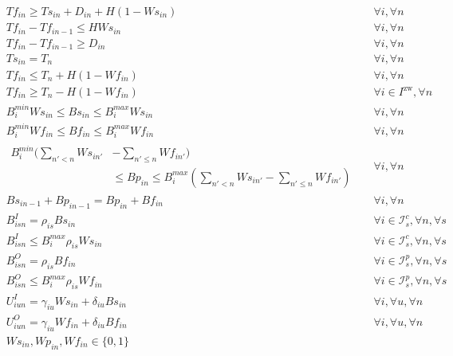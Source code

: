 \begin{align}
		  & Tf_{in} \ge Ts_{in} + D_{in} + H(1 - Ws_{in}) && \forall i, \forall n \\
		  & Tf_{in} - Tf_{in-1} \le H Ws_{in} && \forall i, \forall n \\
		  & Tf_{in} - Tf_{in-1} \ge D_{in} && \forall i, \forall n \\
		  & Ts_{in} = T_n && \forall i, \forall n \\
		  & Tf_{in} \le T_n + H(1 - Wf_{in}) && \forall i, \forall n \\
		  & Tf_{in} \ge T_n - H(1 - Wf_{in}) && \forall i \in I^{\text{zw}}, \forall n \\
		  & B_{i}^{min} Ws_{in} \le Bs_{in} \le B_{i}^{max} Ws_{in} &&  \forall i, \forall n \\
		  & B_{i}^{min} Wf_{in} \le Bf_{in} \le B_{i}^{max} Wf_{in} &&  \forall i, \forall n \\
&\begin{aligned}
		   B_{i}^{min} (\sum_{n' < n} Ws_{in'} & - \sum_{n' \le n} Wf_{in'})\\ &\le Bp_{in} \le B_{i}^{max}  (\sum_{n' < n} Ws_{in'} - \sum_{n' \le n} Wf_{in'})  
\end{aligned}  && \forall i, \forall n \\
		  &Bs_{in-1} + Bp_{in-1} = Bp_{in} + Bf_{in} && \forall i, \forall n \\
		  &B_{isn}^I = \rho_{is} Bs_{in} && \forall i \in \mathcal{I}_{s}^c, \forall n, \forall s \\
		  &B_{isn}^I \le B_{i}^{max} \rho_{is} Ws_{in}  && \forall i \in \mathcal{I}_{s}^c, \forall n, \forall s \\
		  &B_{isn}^O = \rho_{is} Bf_{in} && \forall i \in \mathcal{I}_{s}^p, \forall n, \forall s \\
		  &B_{isn}^O \le B_{i}^{max} \rho_{is} Wf_{in}  && \forall i \in \mathcal{I}_{s}^p, \forall n, \forall s \\
		  &U_{iun}^{I} = \gamma_{iu} Ws_{in} + \delta_{iu} Bs_{in} && \forall i, \forall u, \forall n \\
		  &U_{iun}^{O} = \gamma_{iu} Wf_{in} + \delta_{iu} Bf_{in} && \forall i, \forall u, \forall n \\
		  &Ws_{in}, Wp_{in}, Wf_{in} \in \{0,1\}
\end{align}


